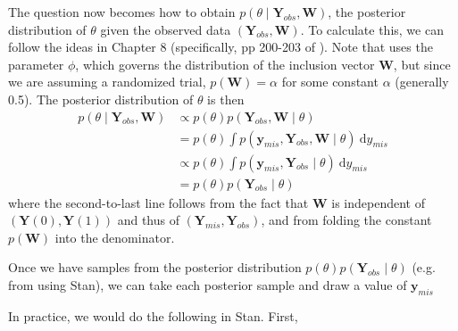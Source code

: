 \documentclass[10pt,a4paper]{article}
\begin{document}
The question now becomes how to obtain $p(\theta \mid \mathbf{Y}_{obs}, \mathbf{W})$, the posterior distribution of $\theta$ given the observed data $(\mathbf{Y}_{obs}, \mathbf{W})$. To calculate this, we can follow the ideas in Chapter 8 (specifically, pp 200-203 of \cite{bda3}). Note that \cite{bda3} uses the parameter $\phi$, which governs the distribution of the inclusion vector $\mathbf{W}$, but since we are assuming a randomized trial, $p(\mathbf{W}) = \alpha$ for some constant $\alpha$ (generally 0.5). The posterior distribution of $\theta$ is then
\begin{align*}
	p(\theta \mid \mathbf{Y}_{obs}, \mathbf{W}) &\propto p(\theta) p(\mathbf{Y}_{obs}, \mathbf{W} \mid \theta) \\[3pt]
	&= p(\theta) \int p(\mathbf{y}_{mis}, \mathbf{Y}_{obs}, \mathbf{W} \mid \theta) ~\text{d} y_{mis} \\[3pt]
	&\propto p(\theta) \int p(\mathbf{y}_{mis}, \mathbf{Y}_{obs} \mid \theta) ~\text{d} y_{mis} \\[3pt]
	&= p(\theta) p(\mathbf{Y}_{obs} \mid \theta)
\end{align*}
where the second-to-last line follows from the fact that $\mathbf{W}$ is independent of $(\mathbf{Y}(0), \mathbf{Y}(1))$ and thus of $(\mathbf{Y}_{mis}, \mathbf{Y}_{obs})$, and from folding the constant $p(\mathbf{W})$ into the denominator.

Once we have samples from the posterior distribution $p(\theta) p(\mathbf{Y}_{obs} \mid \theta)$ (e.g. from using Stan), we can take each posterior sample and draw a value of $\mathbf{y}_{mis}$ 

In practice, we would do the following in Stan. First, 


\end{document}
